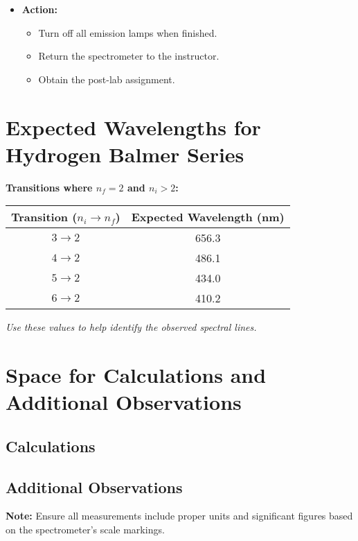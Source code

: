 \documentclass{article}
\begin{document}
\begin{enumerate}
    \begin{itemize}
        \item \textbf{Action:}
        \begin{itemize}
            \item Turn off all emission lamps when finished.
            \item Return the spectrometer to the instructor.
            \item Obtain the post-lab assignment.
        \end{itemize}
    \end{itemize}
    
\end{enumerate}

\section*{Expected Wavelengths for Hydrogen Balmer Series}

\textbf{Transitions where \( n_f = 2 \) and \( n_i > 2 \):}

\begin{center}
\renewcommand{\arraystretch}{1.5}
\begin{tabular}{|c|c|}
\hline
\textbf{Transition (\( n_i \rightarrow n_f \))} & \textbf{Expected Wavelength (nm)} \\ \hline
\( 3 \rightarrow 2 \) & 656.3 \\ \hline
\( 4 \rightarrow 2 \) & 486.1 \\ \hline
\( 5 \rightarrow 2 \) & 434.0 \\ \hline
\( 6 \rightarrow 2 \) & 410.2 \\ \hline
\end{tabular}
\end{center}

\textit{Use these values to help identify the observed spectral lines.}

\section*{Space for Calculations and Additional Observations}

\subsection*{Calculations}

\vspace{6cm}

\subsection*{Additional Observations}

\vspace{6cm}

\noindent\textbf{Note:} Ensure all measurements include proper units and significant figures based on the spectrometer's scale markings.
\end{document}
